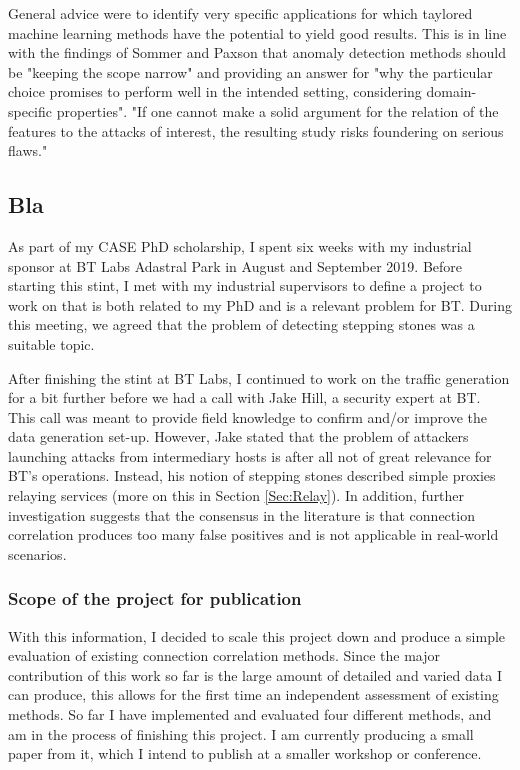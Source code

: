 \documentclass[a4paper,12pt,twoside]{article}
\begin{document}
General advice were to identify very specific applications for which taylored machine learning methods have the potential to yield good results. This is in line with the findings of Sommer and Paxson \cite{sommer_outside_2010} that anomaly detection methods should be "keeping the scope narrow" and providing an answer for "why the particular choice promises to perform well in the intended setting, considering domain-specific properties". "If one cannot make a solid argument for the relation of the features to the attacks of interest, the resulting study risks foundering on serious flaws."

\subsection{Bla}\label{Bla}

As part of my CASE PhD scholarship, I spent six weeks with my industrial sponsor at BT Labs Adastral Park in August and September 2019. Before starting this stint, I met with my industrial supervisors to define a project to work on that is both related to my PhD and is a relevant problem for BT. During this meeting, we agreed that the problem of detecting stepping stones was a suitable topic. 


After finishing the stint at BT Labs, I continued to work on the traffic generation for a bit further before we had a call with Jake Hill, a security expert at BT. This call was meant to provide field knowledge to confirm and/or improve the data generation set-up. However, Jake stated that the problem of attackers launching attacks from intermediary hosts is after all not of great relevance for BT's operations. Instead, his notion of stepping stones described simple proxies relaying services (more on this in Section \ref{Sec:Relay}). In addition, further investigation suggests that the consensus in the literature is that connection correlation produces too many false positives and is not applicable in real-world scenarios. 

\subsubsection{Scope of the project for publication}

With this information, I decided to scale this project down and produce a simple evaluation of existing connection correlation methods. Since the major contribution of this work so far is the large amount of detailed and varied data I can produce, this allows for the first time an independent assessment of existing methods. So far I have implemented and evaluated four different methods, and am in the process of finishing this project. I am currently producing a small paper from it, which I intend to publish at a smaller workshop or conference. 
\end{document}
